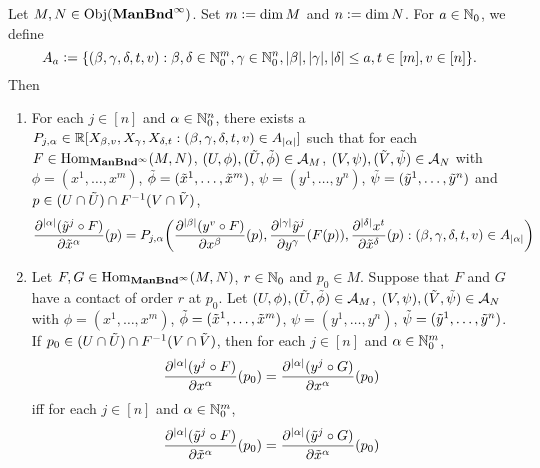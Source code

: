 \documentclass{book}
\begin{document}
\begin{ex}
	Let $M, N \in \operatorname{Obj}(\operatorname*{\text{\textbf{ManBnd}}^{\infty}})$. Set $m \vcentcolon= \dim M$ and $n \vcentcolon= \dim N$. For $a \in \mathbb{N}_0$, we define 
	$$A_a \vcentcolon= \{(\beta, \gamma, \delta, t, v) : \beta, \delta \in \mathbb{N}_0^m, \gamma \in \mathbb{N}_0^n, |\beta|, |\gamma|, |\delta| \leq a, t \in [m], v \in [n]\}.$$ 
	Then
	\begin{enumerate}
		\item For each $j \in [n]$ and $\alpha \in \mathbb{N}_0^n$, there exists a $P_{j, \alpha} \in \mathbb{R}[X_{\beta, v}, X_{\gamma}, X_{\delta, t}: (\beta, \gamma, \delta, t, v) \in A_{|\alpha|}]$ such that for each $F \in \operatorname{Hom}_{\operatorname*{\text{\textbf{ManBnd}}^{\infty}}}(M, N)$, $(U, \phi), (\tilde{U}, \tilde{\phi}) \in \mathcal{A}_M$, $(V, \psi), (\tilde{V}, \tilde{\psi}) \in \mathcal{A}_N$ with $\phi = (x^1, \ldots, x^m)$, $\tilde{\phi} = (\tilde{x}^1, \ldots, \tilde{x}^m)$, $\psi = (y^1, \ldots, y^n)$, $\tilde{\psi} = (\tilde{y}^1, \ldots, \tilde{y}^n)$ and $p \in (U \cap \tilde{U}) \cap F^{-1}(V \cap \tilde{V})$,
		$$\frac{\partial^{|\alpha|} (\tilde{y}^j \circ F)}{\partial \tilde{x}^{\alpha}}(p) = P_{j, \alpha}\bigg( \frac{\partial^{|\beta|} (y^{v} \circ F)}{\partial x^{\beta}}(p),  \frac{\partial^{|\gamma|} \tilde{y}^j}{\partial y^{\gamma}} (F(p)), \frac{\partial^{|\delta|} x^t}{\partial \tilde{x}^{\delta}}(p) : (\beta, \gamma, \delta, t, v) \in A_{|\alpha|} \bigg)$$
		\item Let $F, G \in \operatorname{Hom}_{\operatorname*{\text{\textbf{ManBnd}}^{\infty}}}(M, N)$, $r \in \mathbb{N}_0$ and $p_0 \in M$. Suppose that $F$ and $G$ have a contact of order $r$ at $p_0$. Let $(U, \phi), (\tilde{U}, \tilde{\phi}) \in \mathcal{A}_M$, $(V, \psi), (\tilde{V}, \tilde{\psi}) \in \mathcal{A}_N$ with $\phi = (x^1, \ldots, x^m)$, $\tilde{\phi} = (\tilde{x}^1, \ldots, \tilde{x}^m)$, $\psi = (y^1, \ldots, y^n)$, $\tilde{\psi} = (\tilde{y}^1, \ldots, \tilde{y}^n)$. If $p_0 \in (U \cap \tilde{U}) \cap F^{-1}(V \cap \tilde{V})$, then 
		for each  $j \in [n]$ and $\alpha \in \mathbb{N}_0^m$,
		$$\frac{\partial^{|\alpha|} (y^j \circ F)}{\partial x^{\alpha}}(p_0) =  \frac{\partial^{|\alpha|} (y^j \circ G)}{\partial x^{\alpha}}(p_0)$$ 
		iff for each $j \in [n]$ and $\alpha \in \mathbb{N}_0^m$,
		$$\frac{\partial^{|\alpha|} (\tilde{y}^j \circ F)}{\partial \tilde{x}^{\alpha}}(p_0) =  \frac{\partial^{|\alpha|} (\tilde{y}^j \circ G)}{\partial \tilde{x}^{\alpha}}(p_0)$$
	\end{enumerate}
\end{ex}
\end{document}
